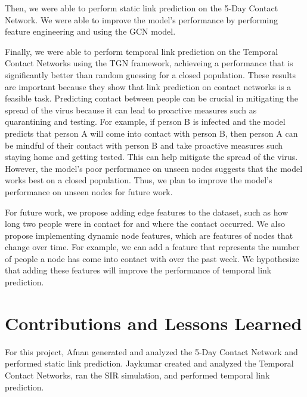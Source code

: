 \documentclass[times, 10pt,twocolumn]{article}
\begin{document}
Then, we were able to perform static link prediction on the 5-Day Contact Network. We were able to improve the model's performance by performing feature engineering and using the GCN model. 

Finally, we were able to perform temporal link prediction on the Temporal Contact Networks using the TGN framework, achieveing a performance that is significantly better than random guessing for a closed population. These results are important because they show that link prediction on contact networks is a feasible task. Predicting contact between people can be crucial in mitigating the spread of the virus because it can lead to proactive measures such as quarantining and testing. For example, if person B is infected and the model predicts that person A will come into contact with person B, then person A can be mindful of their contact with person B and take proactive measures such staying home and getting tested. This can help mitigate the spread of the virus. However, the model's poor performance on unseen nodes suggests that the model works best on a closed population. Thus, we plan to improve the model's performance on unseen nodes for future work.

For future work, we propose adding edge features to the dataset, such as how long two people were in contact for and where the contact occurred. We also propose implementing dynamic node features, which are features of nodes that change over time. For example, we can add a feature that represents the number of people a node has come into contact with over the past week. We hypothesize that adding these features will improve the performance of temporal link prediction.

\section{Contributions and Lessons Learned}

For this project, Afnan generated and analyzed the 5-Day Contact Network and performed static link prediction. Jaykumar created and analyzed the Temporal Contact Networks, ran the SIR simulation, and performed temporal link prediction.
\end{document}
